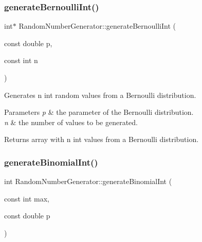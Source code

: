 \subsubsection{\texorpdfstring{generate\+Bernoulli\+Int()}{generateBernoulliInt()}\hspace{0.1cm}{\footnotesize\ttfamily [2/2]}}
{\footnotesize\ttfamily int$\ast$ Random\+Number\+Generator\+::generate\+Bernoulli\+Int (\begin{DoxyParamCaption}\item[{const double}]{p,  }\item[{const int}]{n }\end{DoxyParamCaption})}

Generates n int random values from a Bernoulli distribution. 
\begin{DoxyParams}{Parameters}
{\em p} & the parameter of the Bernoulli distribution. \\
\hline
{\em n} & the number of values to be generated. \\
\hline
\end{DoxyParams}
\begin{DoxyReturn}{Returns}
array with n int values from a Bernoulli distribution. 
\end{DoxyReturn}
\mbox{\label{class_random_number_generator_a417f97fb1a4362621b60107d98c3b4e7}} 
\subsubsection{\texorpdfstring{generate\+Binomial\+Int()}{generateBinomialInt()}\hspace{0.1cm}{\footnotesize\ttfamily [1/2]}}
{\footnotesize\ttfamily int Random\+Number\+Generator\+::generate\+Binomial\+Int (\begin{DoxyParamCaption}\item[{const int}]{max,  }\item[{const double}]{p }\end{DoxyParamCaption})}

